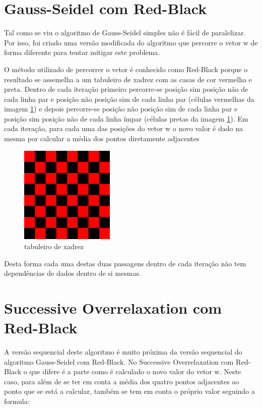 \documentclass[a4paper]{report}
\begin{document}

\section{Gauss-Seidel com Red-Black}

Tal como se viu o algoritmo de Gauss-Seidel simples não é fácil de
paralelizar. Por isso, foi criado uma versão modificada do algoritmo que
percorre o vetor w de forma diferente para tentar mitigar este problema.

O método utilizado de percorrer o vetor é conhecido como Red-Black porque o
resultado se assemelha a um tabuleiro de xadrez com as casas de cor vermelha e
preta. Dentro de cada iteração primeiro percorre-se posição sim posição não de
cada linha par e posição não posição sim de cada linha par (células vermelhas da
imagem \ref{fig:chess}) e depois percorre-se posição não posição sim de cada
linha par e posição sim posição não de cada linha ímpar (células pretas da
imagem \ref{fig:chess}). Em cada iteração, para cada uma das posições do vetor w
o novo valor é dado na mesma por calcular a média dos pontos diretamente
adjacentes

\begin{figure}[h]
    \centering
        \includegraphics[width=0.4\textwidth]{images/chess.jpg}
        \caption{tabuleiro de xadrez}
        \label{fig:chess}
\end{figure}

Desta forma cada uma destas duas passagens dentro de cada iteração não tem
dependências de dados dentro de si mesmas.


\section{Successive Overrelaxation com Red-Black}

A versão sequencial deste algoritmo é muito próxima da versão sequencial do
algoritmo Gauss-Seidel com Red-Black. No Successive Overrelaxation com Red-Black
o que difere é a parte como é calculado o novo valor do vetor w. Neste caso,
para além de se ter em conta a média dos quatro pontos adjacentes ao ponto que
se está a calcular, também se tem em conta o próprio valor seguindo a formula:
\end{document}
